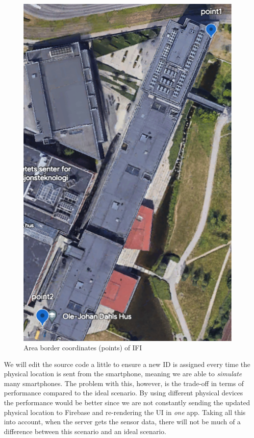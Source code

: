 \documentclass{article}
\begin{document}
\begin{figure}[H]
    \centering
    \includegraphics[scale=0.26]{graphics/google_earth.png}
    \caption{Area border coordinates (points) of IFI}
    \label{fig:google_earth}
\end{figure}

We will edit the source code a little to ensure a new ID is assigned every time the physical location is sent from the smartphone, meaning we are able to \emph{simulate} many smartphones. The problem with this, however, is the trade-off in terms of performance compared to the ideal scenario. By using different physical devices the performance would be better since we are not constantly sending the updated physical location to Firebase and re-rendering the UI in \emph{one} app. Taking all this into account, when the server gets the sensor data, there will not be much of a difference between this scenario and an ideal scenario.
\end{document}
